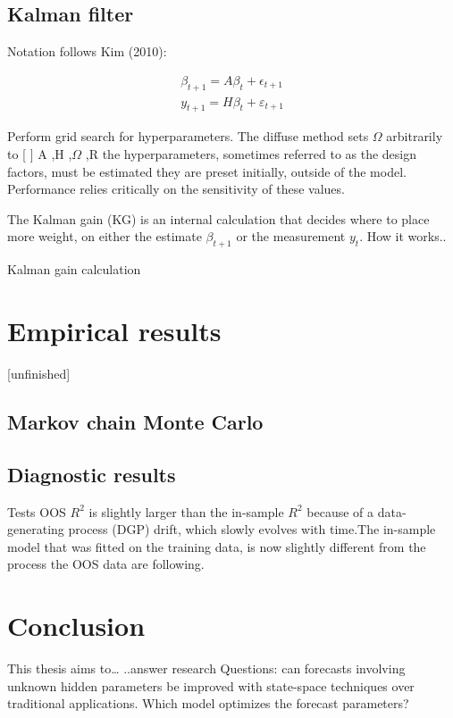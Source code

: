 \documentclass[12pt, letterpaper]{article}
\begin{document}
	
	

	\subsection{Kalman filter}
	 Notation follows Kim (2010):
	
	\begin{gather*} 
	 \beta_{t+1}= A\beta_t + \epsilon_{t+1} \\
	 y_{t+1}= H\beta_t + \varepsilon_{t+1}
	 \end{gather*}
	
	 Perform grid search for hyperparameters. The diffuse method sets $\Omega$
	 arbitrarily to [ ] \newline
	 A ,H ,$\Omega$ ,R the hyperparameters, sometimes referred to as the design factors, must be estimated they are preset initially, outside of the model. Performance relies critically on the sensitivity of these values.  

The Kalman gain (KG) is an internal calculation that decides where to place more weight, on either the estimate $\beta_{t+1} $ or the measurement $ y_t$. How it works.. 

	Kalman gain calculation


	\section{Empirical results}
	
	[unfinished]
	\subsection{Markov chain Monte Carlo}
	
	\subsection{Diagnostic results}
Tests
	OOS $R^2$ is slightly larger than the in-sample $R^2$ because of a data-generating process (DGP) drift, which slowly evolves with time.The in-sample model that was fitted on the training data, is now slightly different from the process the OOS data are following.
	
	\section{Conclusion}
	
	This thesis aims to… \newline \newline ..answer research Questions: can forecasts involving unknown hidden parameters be improved with state-space techniques over traditional applications. Which model optimizes the forecast parameters?
	
\end{document}
